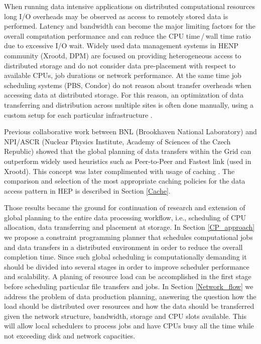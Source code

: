 \documentclass[english]{ddny}
\begin{document}
When running data intensive applications on distributed computational resources long I/O overheads may be observed as access to remotely stored data is performed. Latency and bandwidth can become the major limiting factors for the overall computation performance and can reduce the CPU time\,/\,wall time ratio due to excessive I/O wait.  Widely used data management systems in HENP community (Xrootd, DPM) are focused on providing heterogeneous access to distributed storage and do not consider data pre-placement with respect to available CPUs, job durations or network performance. At the same time job scheduling systems (PBS, Condor) do not reason about transfer overheads when accessing data at distributed storage. For this reason, an optimization of data transferring and distribution across multiple sites is often done manually, using a custom setup for each particular infrastructure \cite{Balewski_2012pa}.

Previous collaborative work between BNL (Brookhaven National Laboratory) and NPI/ASCR (Nuclear Physics Institute, Academy of Sciences of the Czech Republic) showed that the global planning of data transfers within the Grid can outperform widely used heuristics such as Peer-to-Peer and Fastest link (used in Xrootd)\cite{Zerola}. This concept was later complimented with usage of caching \cite{Makatun_cache}. The comparison and selection of the most appropriate caching policies for the data access pattern in HEP is described in Section \ref{Cache}. 
 
Those results became the ground for continuation of research and extension of global planning to the entire data processing workflow, i.e., scheduling of CPU allocation, data transferring and  placement at storage. In Section \ref{CP_approach} we propose a constraint programming planner that schedules computational jobs and data transfers in a distributed environment in order to reduce the overall completion time. Since such global scheduling is computationally demanding it should be divided into several stages in order to improve scheduler performance and scalability. A planing of resource load can be accomplished in the first stage before scheduling particular file transfers and jobs. In Section \ref{Network_flow} we address the problem of data production planning, answering the question how the load should be distributed over resources and how the data should be transferred given the network structure, bandwidth, storage and CPU slots available. This will allow local schedulers to process jobs and have CPUs busy all the time while not exceeding disk and network capacities.
\end{document}
